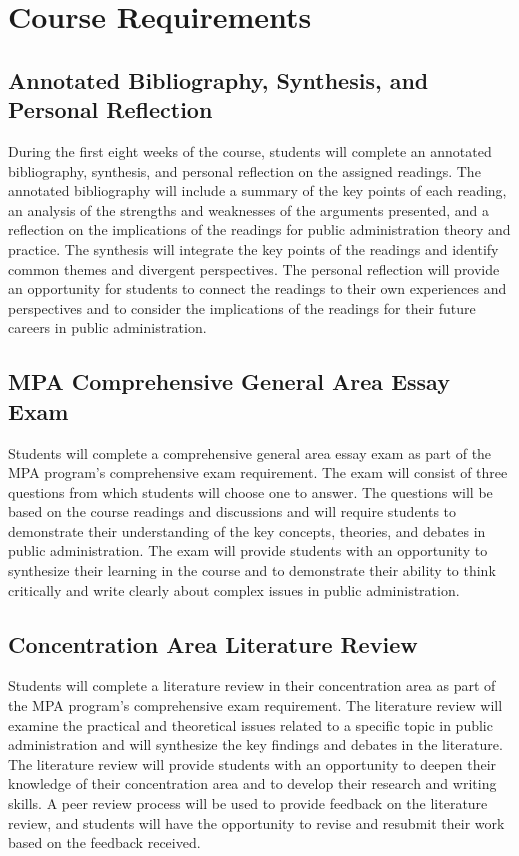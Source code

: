\documentclass[12pt, letterpaper]{article}
\begin{document}
\section{Course Requirements}

\subsection*{Annotated Bibliography, Synthesis, and Personal Reflection}

During the first eight weeks of the course, students will complete an annotated bibliography, synthesis, and personal reflection on the assigned readings. The annotated bibliography will include a summary of the key points of each reading, an analysis of the strengths and weaknesses of the arguments presented, and a reflection on the implications of the readings for public administration theory and practice. The synthesis will integrate the key points of the readings and identify common themes and divergent perspectives. The personal reflection will provide an opportunity for students to connect the readings to their own experiences and perspectives and to consider the implications of the readings for their future careers in public administration.

\subsection*{MPA Comprehensive General Area Essay Exam}

Students will complete a comprehensive general area essay exam as part of the MPA program's comprehensive exam requirement. The exam will consist of three questions from which students will choose one to answer. The questions will be based on the course readings and discussions and will require students to demonstrate their understanding of the key concepts, theories, and debates in public administration. The exam will provide students with an opportunity to synthesize their learning in the course and to demonstrate their ability to think critically and write clearly about complex issues in public administration.

\subsection*{Concentration Area Literature Review}

Students will complete a literature review in their concentration area as part of the MPA program's comprehensive exam requirement. The literature review will examine the practical and theoretical issues related to a specific topic in public administration and will synthesize the key findings and debates in the literature. The literature review will provide students with an opportunity to deepen their knowledge of their concentration area and to develop their research and writing skills. A peer review process will be used to provide feedback on the literature review, and students will have the opportunity to revise and resubmit their work based on the feedback received.
\end{document}
